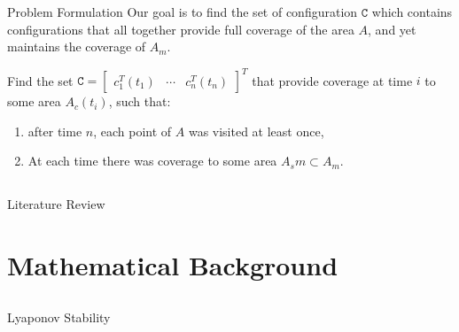 \documentclass[t]{beamer}
\newcommand{\bmat}[1]{\begin{bmatrix}#1\end{bmatrix}}
\begin{document}
\begin{frame}[label=formulation3]{Problem Formulation}
Our goal is to find the set of configuration $\texttt{C}$ which contains configurations that all together provide full coverage of the area $A$, and yet maintains the coverage of $A_m$.

\begin{problem} \label{GeneralProblem}
Find the set $\texttt{C} = \bmat{
c_{1}^{T}\left(t_1\right)&\cdots&c_{n}^{T}\left(t_n\right)}^{T}$ that provide coverage at time $i$ to some area $A_c \left( t_i \right)$, such that:
\begin{enumerate}
\item after time $n$, each point of $A$ was visited at least once,
\item At each time there was coverage to some area $A_sm \subset A_m$.
\end{enumerate}
\end{problem}
\end{frame}

\subsection[Literature Review]{}
\begin{frame}[label=sl1]{Literature Review}

\end{frame}


\section[Mathematical Background]{Mathematical Background}
\subsection[Lyaponov Stability]{}
\begin{frame}[label=sl2]{Lyaponov Stability}

\end{frame}
\end{document}

